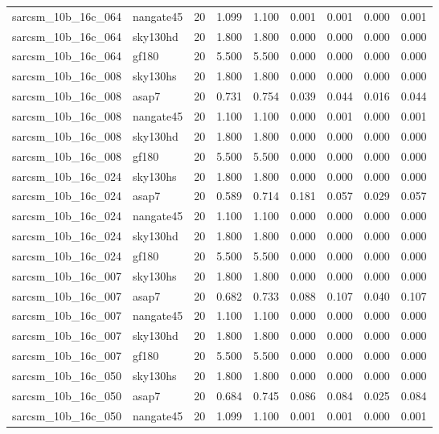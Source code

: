 \begin{tabular}{llrrrrrrr}
sarcsm\_10b\_16c\_064 & nangate45 & 20 & 1.099 & 1.100 & 0.001 & 0.001 & 0.000 & 0.001 \\
sarcsm\_10b\_16c\_064 & sky130hd & 20 & 1.800 & 1.800 & 0.000 & 0.000 & 0.000 & 0.000 \\
sarcsm\_10b\_16c\_064 & gf180 & 20 & 5.500 & 5.500 & 0.000 & 0.000 & 0.000 & 0.000 \\
sarcsm\_10b\_16c\_008 & sky130hs & 20 & 1.800 & 1.800 & 0.000 & 0.000 & 0.000 & 0.000 \\
sarcsm\_10b\_16c\_008 & asap7 & 20 & 0.731 & 0.754 & 0.039 & 0.044 & 0.016 & 0.044 \\
sarcsm\_10b\_16c\_008 & nangate45 & 20 & 1.100 & 1.100 & 0.000 & 0.001 & 0.000 & 0.001 \\
sarcsm\_10b\_16c\_008 & sky130hd & 20 & 1.800 & 1.800 & 0.000 & 0.000 & 0.000 & 0.000 \\
sarcsm\_10b\_16c\_008 & gf180 & 20 & 5.500 & 5.500 & 0.000 & 0.000 & 0.000 & 0.000 \\
sarcsm\_10b\_16c\_024 & sky130hs & 20 & 1.800 & 1.800 & 0.000 & 0.000 & 0.000 & 0.000 \\
sarcsm\_10b\_16c\_024 & asap7 & 20 & 0.589 & 0.714 & 0.181 & 0.057 & 0.029 & 0.057 \\
sarcsm\_10b\_16c\_024 & nangate45 & 20 & 1.100 & 1.100 & 0.000 & 0.000 & 0.000 & 0.000 \\
sarcsm\_10b\_16c\_024 & sky130hd & 20 & 1.800 & 1.800 & 0.000 & 0.000 & 0.000 & 0.000 \\
sarcsm\_10b\_16c\_024 & gf180 & 20 & 5.500 & 5.500 & 0.000 & 0.000 & 0.000 & 0.000 \\
sarcsm\_10b\_16c\_007 & sky130hs & 20 & 1.800 & 1.800 & 0.000 & 0.000 & 0.000 & 0.000 \\
sarcsm\_10b\_16c\_007 & asap7 & 20 & 0.682 & 0.733 & 0.088 & 0.107 & 0.040 & 0.107 \\
sarcsm\_10b\_16c\_007 & nangate45 & 20 & 1.100 & 1.100 & 0.000 & 0.000 & 0.000 & 0.000 \\
sarcsm\_10b\_16c\_007 & sky130hd & 20 & 1.800 & 1.800 & 0.000 & 0.000 & 0.000 & 0.000 \\
sarcsm\_10b\_16c\_007 & gf180 & 20 & 5.500 & 5.500 & 0.000 & 0.000 & 0.000 & 0.000 \\
sarcsm\_10b\_16c\_050 & sky130hs & 20 & 1.800 & 1.800 & 0.000 & 0.000 & 0.000 & 0.000 \\
sarcsm\_10b\_16c\_050 & asap7 & 20 & 0.684 & 0.745 & 0.086 & 0.084 & 0.025 & 0.084 \\
sarcsm\_10b\_16c\_050 & nangate45 & 20 & 1.099 & 1.100 & 0.001 & 0.001 & 0.000 & 0.001 \\

\end{tabular}
